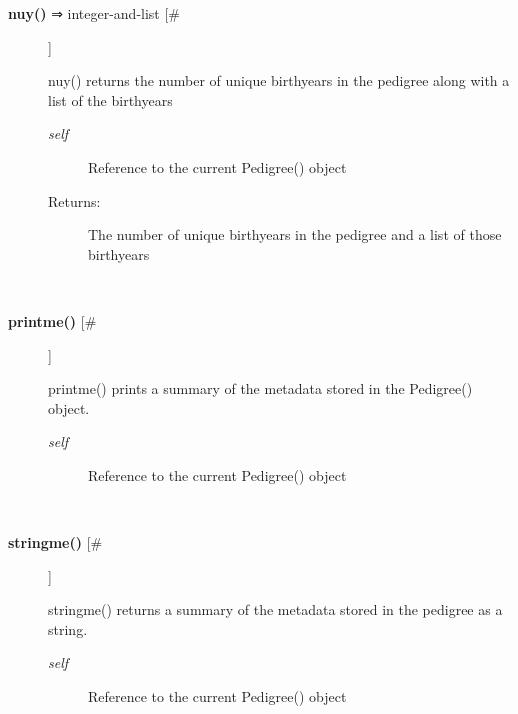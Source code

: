 \documentclass[10pt]{article}
\begin{document}
\begin{description}
\item[\textbf{nuy()}
 ⇒ integer-and-list [\#]]

 nuy() returns the number of unique birthyears in the pedigree along with a list of the birthyears
\begin{description}
\item[\emph{self}
] Reference to the current Pedigree() object
\item[Returns:] The number of unique birthyears in the pedigree and a list of those birthyears

\end{description}
\\ 

\item[\textbf{printme()}
 [\#]]

 printme() prints a summary of the metadata stored in the Pedigree() object.
\begin{description}
\item[\emph{self}
] Reference to the current Pedigree() object

\end{description}
\\ 

\item[\textbf{stringme()}
 [\#]]

 stringme() returns a summary of the metadata stored in the pedigree as a string.
\begin{description}
\item[\emph{self}
] Reference to the current Pedigree() object

\end{description}
\\ 


\end{description}
\end{document}
